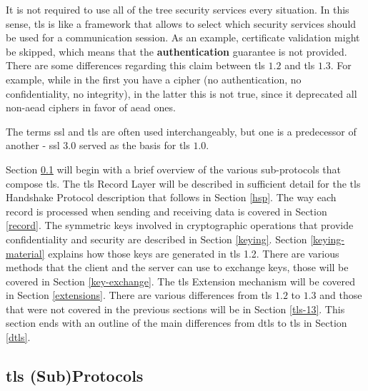 \documentclass{llncs}
\begin{document}
{It is not required to use all of the tree security services every situation.
In this sense, \gls{tls} is like a framework that allows to select which security services should be used for a communication session. As an example,
certificate validation might be skipped, which means that the \textbf{authentication} guarantee is not provided. There are some differences regarding this claim between \gls{tls} $1.2$\cite{RFC5246}
and \gls{tls} $1.3$. For example, while in the first you have a 
cipher (no authentication, no confidentiality, no integrity), in the latter
this is not true, since it deprecated all non-\gls{aead} ciphers in favor of
\gls{aead} ones.

The terms \gls{ssl} and \gls{tls} are often used interchangeably, but one is
a predecessor of another - \gls{ssl} $3.0$\cite{RFC6101} served as the basis
for \gls{tls} $1.0$\cite{RFC6101}.

Section \ref{subprotocols} will begin with a brief overview of the various sub-protocols that compose \gls{tls}. The \gls{tls} Record Layer will
be described in sufficient detail for the \gls{tls} Handshake Protocol
description that follows in Section \ref{hsp}. The way each record is
processed when sending and receiving data is covered in Section \ref{record}.
The symmetric keys involved in cryptographic operations that provide
confidentiality and security are described in Section \ref{keying}. Section
\ref{keying-material} explains how those keys are generated in \gls{tls} 1.2.
There are various methods that the client and the server can use to exchange
keys, those will be covered in Section \ref{key-exchange}. The \gls{tls}
Extension mechanism will be covered in Section \ref{extensions}. There
are various differences from \gls{tls} $1.2$ to $1.3$ and those that were
not covered in the previous sections will be in Section \ref{tls-13}.
This section ends with an outline of the main differences from \gls{dtls} to \gls{tls} in Section \ref{dtls}.


\subsection{\gls{tls} (Sub)Protocols} \label{subprotocols}

}
\end{document}
